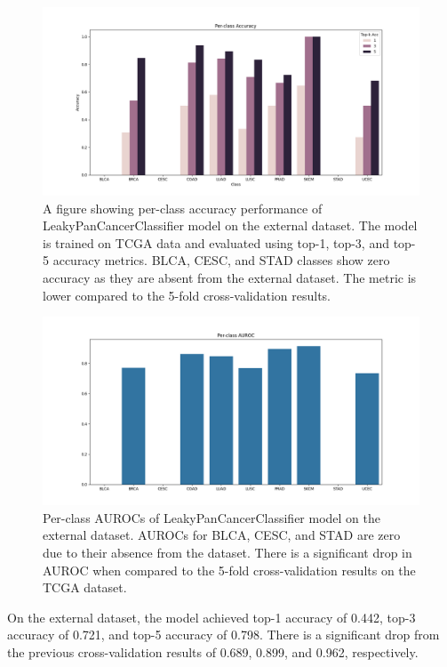 \documentclass{l4proj}
\begin{document}
\begin{figure}[t]
    \centering
    \includegraphics[width=1\linewidth]{images/class_accuracy.png}
    \caption{A figure showing per-class accuracy performance of LeakyPanCancerClassifier model on the external dataset. The model is trained on TCGA data and evaluated using top-1, top-3, and top-5 accuracy metrics. BLCA, CESC, and STAD classes show zero accuracy as they are absent from the external dataset. The metric is lower compared to the 5-fold cross-validation results.}
    \label{fig:class-acc-ext}
\end{figure}

\begin{figure}[h!]
    \centering
    \includegraphics[width=1\linewidth]{images/class_auroc.png}
    \caption{Per-class AUROCs of LeakyPanCancerClassifier model on the external dataset. AUROCs for BLCA, CESC, and STAD are zero due to their absence from the dataset. There is a significant drop in AUROC when compared to the 5-fold cross-validation results on the TCGA dataset.}
    \label{fig:class-auroc-ext}
\end{figure}

On the external dataset, the model achieved top-1 accuracy of 0.442, top-3 accuracy of 0.721, and top-5 accuracy of 0.798. There is a significant drop from the previous cross-validation results of 0.689, 0.899, and 0.962, respectively. 
\end{document}
